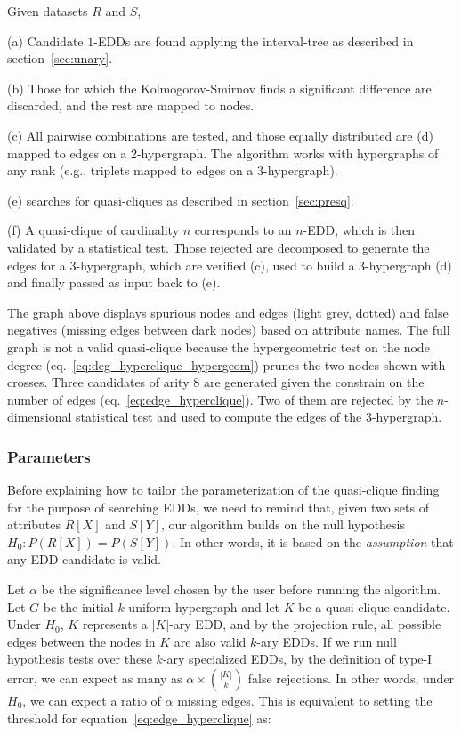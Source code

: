 \begin{multicols}{2}
 Given datasets $R$ and $S$,

(a) Candidate $1$-\glspl{EDD} are found applying the interval-tree as described in section~\ref{sec:unary}.

(b) Those for which the Kolmogorov-Smirnov finds a significant difference are discarded,
    and the rest are mapped to nodes.

(c) All pairwise combinations are tested, and those equally distributed are
    (d) mapped to edges on a 2-hypergraph. The algorithm works with hypergraphs of any rank
    (e.g., triplets mapped to edges on a 3-hypergraph).
    
(e) \PresQ searches for quasi-cliques as described in section~\ref{sec:presq}.

(f) A quasi-clique of cardinality $n$ corresponds to an $n$-EDD, which is then validated by
a statistical test. Those rejected are decomposed to generate the edges for a 3-hypergraph, which are
verified (c), used to build a $3$-hypergraph (d) and finally passed as input back to (e).

The graph above displays spurious nodes and edges (light grey, dotted) and false negatives
(missing edges between dark nodes) based on attribute names. The full graph is not a valid
quasi-clique because the hypergeometric
test on the node degree (eq.~\ref{eq:deg_hyperclique_hypergeom}) prunes the two nodes shown with
crosses.
Three candidates of arity 8 are generated given the constrain on the number of edges 
(eq.~\ref{eq:edge_hyperclique}). Two of them are rejected by the $n$-dimensional statistical test and used to compute the edges of the $3$-hypergraph.

\end{multicols}
    
\newpage

\subsubsection{Parameters}

Before explaining how to tailor the parameterization of the quasi-clique finding for the purpose
of searching \glspl{EDD}, we need to remind that, given two sets of attributes $R[X]$ and $S[Y]$,
our algorithm builds on the null hypothesis $H_0: P(R[X]) = P(S[Y])$.
In other words, it is based on the \emph{assumption} that any \gls{EDD} candidate is valid.

Let $\alpha$ be the significance level chosen by the user before running the algorithm.
Let $G$ be the initial $k$-uniform hypergraph and let $K$ be a quasi-clique candidate.
Under $H_0$, $K$ represents a $|K|$-ary EDD, and by the projection rule,
all possible edges between the nodes in $K$ are also valid $k$-ary \glspl{EDD}.
If we run null hypothesis tests over these $k$-ary specialized \glspl{EDD},
by the definition of type-I error, we can expect as many as $\alpha \times \binom{|K|}{k}$ false rejections.
In other words, under $H_0$, we can expect a ratio of $\alpha$ missing edges.
This is equivalent to setting the threshold for equation~\ref{eq:edge_hyperclique} as:

